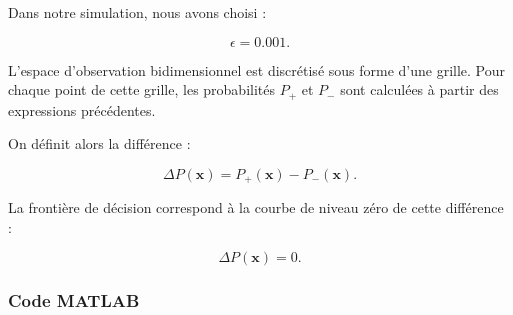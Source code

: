 Dans notre simulation, nous avons choisi :

\begin{equation}
\epsilon=0.001.
\end{equation}

L'espace d'observation bidimensionnel est discrétisé
sous forme d'une grille. Pour chaque point de cette
grille, les probabilités $P_+$ et $P_-$ sont calculées
à partir des expressions précédentes.

On définit alors la différence :

\begin{equation}
\Delta P(\mathbf{x})=
P_+(\mathbf{x})-P_-(\mathbf{x}).
\end{equation}

La frontière de décision correspond à la courbe de
niveau zéro de cette différence :

\begin{equation}
\boxed{\Delta P(\mathbf{x})=0.}
\end{equation}

\subsubsection{Code MATLAB}

